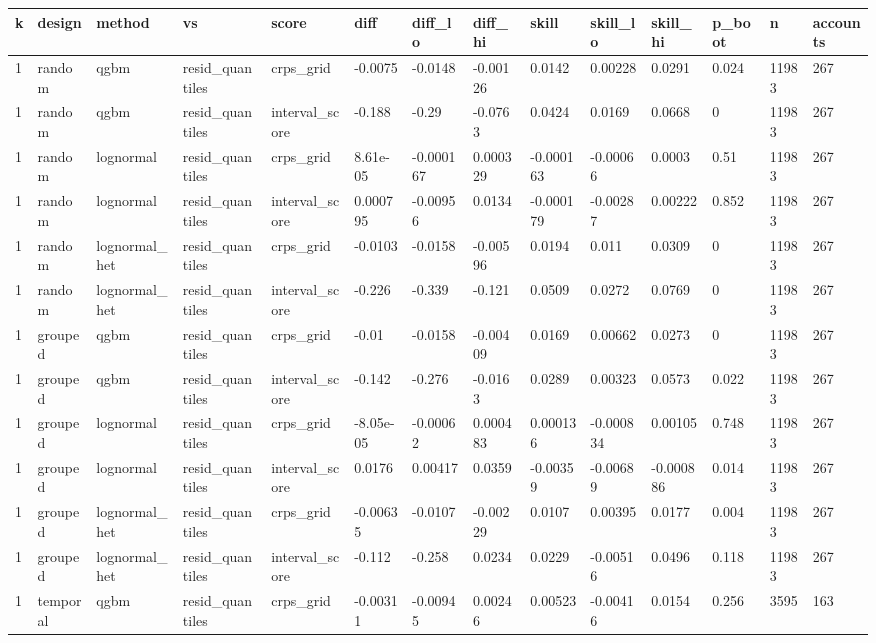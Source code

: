 \begin{tabular}{llllllllllllll}
\toprule
k & design & method & vs & score & diff & diff\_lo & diff\_hi & skill & skill\_lo & skill\_hi & p\_boot & n & accounts \\
\midrule
1 & random & qgbm & resid\_quantiles & crps\_grid & -0.0075 & -0.0148 & -0.00126 & 0.0142 & 0.00228 & 0.0291 & 0.024 & 11983 & 267 \\
1 & random & qgbm & resid\_quantiles & interval\_score & -0.188 & -0.29 & -0.0763 & 0.0424 & 0.0169 & 0.0668 & 0 & 11983 & 267 \\
1 & random & lognormal & resid\_quantiles & crps\_grid & 8.61e-05 & -0.000167 & 0.000329 & -0.000163 & -0.00066 & 0.0003 & 0.51 & 11983 & 267 \\
1 & random & lognormal & resid\_quantiles & interval\_score & 0.000795 & -0.00956 & 0.0134 & -0.000179 & -0.00287 & 0.00222 & 0.852 & 11983 & 267 \\
1 & random & lognormal\_het & resid\_quantiles & crps\_grid & -0.0103 & -0.0158 & -0.00596 & 0.0194 & 0.011 & 0.0309 & 0 & 11983 & 267 \\
1 & random & lognormal\_het & resid\_quantiles & interval\_score & -0.226 & -0.339 & -0.121 & 0.0509 & 0.0272 & 0.0769 & 0 & 11983 & 267 \\
1 & grouped & qgbm & resid\_quantiles & crps\_grid & -0.01 & -0.0158 & -0.00409 & 0.0169 & 0.00662 & 0.0273 & 0 & 11983 & 267 \\
1 & grouped & qgbm & resid\_quantiles & interval\_score & -0.142 & -0.276 & -0.0163 & 0.0289 & 0.00323 & 0.0573 & 0.022 & 11983 & 267 \\
1 & grouped & lognormal & resid\_quantiles & crps\_grid & -8.05e-05 & -0.00062 & 0.000483 & 0.000136 & -0.000834 & 0.00105 & 0.748 & 11983 & 267 \\
1 & grouped & lognormal & resid\_quantiles & interval\_score & 0.0176 & 0.00417 & 0.0359 & -0.00359 & -0.00689 & -0.000886 & 0.014 & 11983 & 267 \\
1 & grouped & lognormal\_het & resid\_quantiles & crps\_grid & -0.00635 & -0.0107 & -0.00229 & 0.0107 & 0.00395 & 0.0177 & 0.004 & 11983 & 267 \\
1 & grouped & lognormal\_het & resid\_quantiles & interval\_score & -0.112 & -0.258 & 0.0234 & 0.0229 & -0.00516 & 0.0496 & 0.118 & 11983 & 267 \\
1 & temporal & qgbm & resid\_quantiles & crps\_grid & -0.00311 & -0.00945 & 0.00246 & 0.00523 & -0.00416 & 0.0154 & 0.256 & 3595 & 163 \\

\end{tabular}
